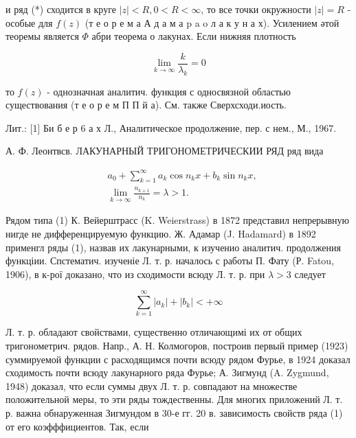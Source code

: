 \documentclass[10pt]{article}
\begin{document}
и ряд (*) сходится в круге $|z|<R, 0<R<\infty$, то все точки окружности $|z|=R$ - особые для $f(z)$ (т е о р е м а А д а м а p a o л а к у н а х). Усилением әтой теоремы является $\Phi$ абри теорема о лакунах. Если нижняя плотность



\[

\lim _{k \rightarrow \infty} \frac{k}{\lambda_{k}}=0

\]



то $f(z)$ - однозначная аналитич. функция с односвязной областью существования (т е о р е м П П й а). См. также Сверхсходи.иость.



Лит.: [1] Би б е р 6 а х Л., Аналитическое продолжение, пер. с нем., М., 1967.



А. Ф. Леонтвсв. ЛАКУНАРНЫЙ ТРИГОНОМЕТРИЧЕСКИИ РЯД ряд вида



\[

\begin{aligned}

& a_{0}+\sum_{k=1}^{\infty} a_{k} \cos n_{k} x+b_{k} \sin n_{k} x, \\

& \lim _{k \rightarrow \infty} \frac{n_{k+1}}{n_{k}}=\lambda>1 \text {. }

\end{aligned}

\]



Рядом типа (1) К. Вейерштрасс (K. Weierstrass) в 1872 представил непрерывную нигде не дифференцируемую функцию. Ж. Адамар (J. Hadamard) в 1892 применгл ряды (1), назвав их лакунарными, к изученио аналитич. продолжения функціии. Спстематич. изученіе Л. т. р. началось с работы П. Фату (Р. Fatou, 1906), в к-рої доказано, что из сходимости всюду Л. т. р. при $\lambda>3$ следует



\[

\sum_{k=1}^{\infty}\left|a_{k}\right|+\left|b_{k}\right|<+\infty

\]



Л. т. р. обладают свойствами, существенно отличающимі их от общих тригонометрич. рядов. Напр., А. Н. Колмогоров, построив первый пример (1923) суммируемой функции с расходящимся почти всюду рядом Фурье, в 1924 доказал сходимость почти всюду лакунарного ряда Фурье; А. Зигмунд (A. Zygmund, 1948) доказал, что если суммы двух Л. т. р. совпадают на множестве положительной меры, то эти ряды тождественны. Для многих приложений Л. т. р. важна обнаруженная Зигмундом в 30-е гг. 20 в. зависимость свойств ряда (1) от его коэфффициентов. Так, если
\end{document}
